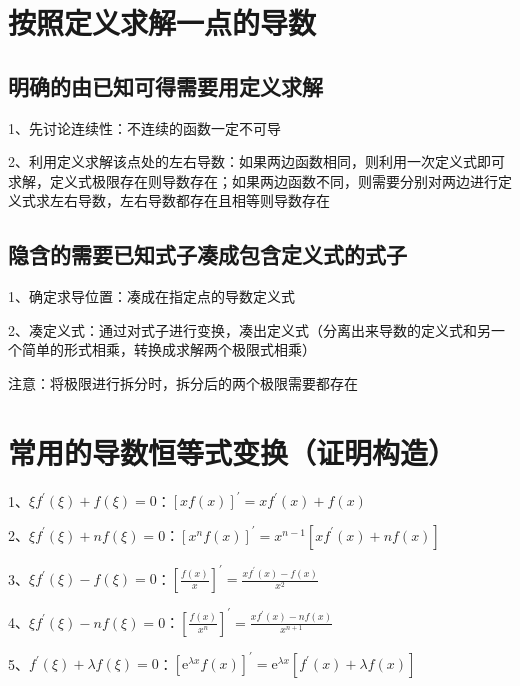 \section{按照定义求解一点的导数}



\subsection{明确的由已知可得需要用定义求解}

1、先讨论连续性：不连续的函数一定不可导

2、利用定义求解该点处的左右导数：如果两边函数相同，则利用一次定义式即可求解，定义式极限存在则导数存在；如果两边函数不同，则需要分别对两边进行定义式求左右导数，左右导数都存在且相等则导数存在



\subsection{隐含的需要已知式子凑成包含定义式的式子}

1、确定求导位置：凑成在指定点的导数定义式

2、凑定义式：通过对式子进行变换，凑出定义式（分离出来导数的定义式和另一个简单的形式相乘，转换成求解两个极限式相乘）

注意：将极限进行拆分时，拆分后的两个极限需要都存在

\section{常用的导数恒等式变换（证明构造）}

1、$ \xi f^{\prime}(\xi)+f(\xi)=0 $：$ [x f(x)]^{\prime}=x f^{\prime}(x)+f(x) $

2、$ \xi f^{\prime}(\xi)+n f(\xi)=0 $：$ \left[x^{n} f(x)\right]^{\prime}=x^{n-1}\left[x f^{\prime}(x)+n f(x)\right] $

3、$ \xi f^{\prime}(\xi)-f(\xi)=0 $：$ \left[\frac{f(x)}{x}\right]^{\prime}=\frac{x f^{\prime}(x)-f(x)}{x^{2}} $

4、$ \xi f^{\prime}(\xi)-n f(\xi)=0 $：$ \left[\frac{f(x)}{x^{n}}\right]^{\prime}=\frac{x f^{\prime}(x)-n f(x)}{x^{n+1}} $

5、$ f^{\prime}(\xi)+\lambda f(\xi)=0 $：$ \left[\mathrm{e}^{\lambda x} f(x)\right]^{\prime}=\mathrm{e}^{\lambda x}\left[f^{\prime}(x)+\lambda f(x)\right] $

